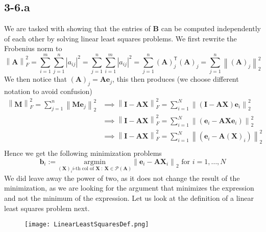 \documentclass{article}
\begin{document}
\subsection*{3-6.a} 
We are tasked with showing that the entries of $\mathbf{B}$ can be computed independently of each other by solving linear least squares problems. We first rewrite the Frobenius norm to
\begin{equation*}
    \left\lVert \mathbf{A}\right\rVert_{F}^{2} = \sum_{i=1}^{m}\sum_{j=1}^{n}\left\lvert a_{ij} \right\rvert^{2} =  \sum_{j=1}^{n}\sum_{i=1}^{m}\left\lvert a_{ij} \right\rvert^{2} = \sum_{j=1}^{n}\left(\mathbf{A}\right)_{j}^{\mathsf{T}}\left(\mathbf{A}\right)_{j} = \sum_{j=1}^{n} \left\lVert \left(\mathbf{A}\right)_{j} \right\rVert_{2}^{2}
\end{equation*}
We then notice that $\left(\mathbf{A}\right)_{j}  = \mathbf{A}\mathbf{e}_{j}$, this then produces (we choose different notation to avoid confusion)
\begin{align*}
    \left\lVert \mathbf{M}\right\rVert_{F}^{2} = \sum_{j=1}^{n} \left\lVert\mathbf{M}\mathbf{e}_{j}  \right\rVert_{2}^{2} &\implies \left\lVert \mathbf{I} - \mathbf{A}\mathbf{X}\right\rVert_{F}^{2} = \sum_{i=1}^{N} \left\lVert \left(\mathbf{I}-\mathbf{A}\mathbf{X}\right)\mathbf{e}_{i}\right\rVert_{2}^{2} \\
    &\implies \left\lVert \mathbf{I} - \mathbf{A}\mathbf{X}\right\rVert_{F}^{2} = \sum_{i=1}^{N} \left\lVert \left(\mathbf{e}_{i}-\mathbf{A}\mathbf{X}\mathbf{e}_{i}\right)\right\rVert_{2}^{2} \\
    &\implies \left\lVert \mathbf{I} - \mathbf{A}\mathbf{X}\right\rVert_{F}^{2} = \sum_{i=1}^{N} \left\lVert \left(\mathbf{e}_{i}-\mathbf{A}\left(\mathbf{X}\right)_{i}\right)\right\rVert_{2}^{2} \\
    \end{align*}
Hence we get the following minimization problems
\begin{equation*}
    \mathbf{b}_{i} := \underset{\left(\mathbf{X}\right)_{i} i\text{-th col of } \mathbf{X}\: : \:  \mathbf{X}\in\mathcal{P}\left(\mathbf{A}\right)}{\text{argmin}}\left\lVert \mathbf{e}_{i} - \mathbf{A}\mathbf{X}_{i}\right\rVert_{2} \text{ for } i = 1, \dots , N
\end{equation*}
We did leave away the power of two, as it does not change the result of the minimization, as we are looking for the argument that minimizes the expression and not the minimum of the expression. Let us look at the definition of a linear least squares problem next.
\begin{figure}[!hbt]
    \centering
\texttt{[image: LinearLeastSquaresDef.png]}
\end{figure}
\end{document}
